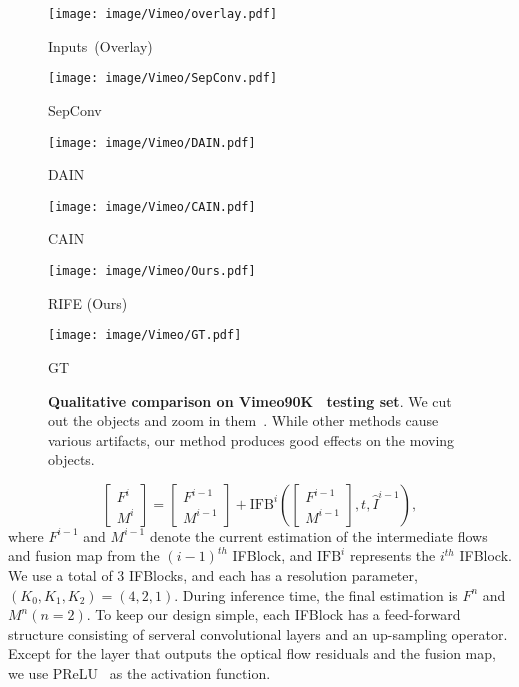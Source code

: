 \documentclass[final]{cvpr}
\begin{document}
\begin{figure*}[htbp]
  \centering
  \begin{minipage}[t]{0.162\linewidth}
  \centering
  \texttt{[image: image/Vimeo/overlay.pdf]}
  \centerline{Inputs~(Overlay)}
  \end{minipage}
  \begin{minipage}[t]{0.162\linewidth}
  \centering
  \texttt{[image: image/Vimeo/SepConv.pdf]}
  \centerline{SepConv~\cite{niklaus2017video}}
  \end{minipage}
\begin{minipage}[t]{0.162\linewidth}
  \centering
  \texttt{[image: image/Vimeo/DAIN.pdf]}
  \centerline{DAIN~\cite{bao2019depth}}
  \end{minipage}
  \begin{minipage}[t]{0.162\linewidth}
  \centering
  \texttt{[image: image/Vimeo/CAIN.pdf]}
  \centerline{CAIN~\cite{choi2020channel}}
  \end{minipage}
  \begin{minipage}[t]{0.163\textwidth}
  \centering
  \texttt{[image: image/Vimeo/Ours.pdf]}
  \centerline{RIFE (Ours)}
  \end{minipage}
  \begin{minipage}[t]{0.1635\textwidth}
  \centering
  \texttt{[image: image/Vimeo/GT.pdf]}
  \centerline{GT}
  \end{minipage}
  \caption{\textbf{Qualitative comparison on Vimeo90K~\cite{xue2019video} testing set}. We cut out the objects and zoom in them~\cite{choi2020channel}. While other methods cause various artifacts, our method produces good effects on the moving objects.}
\label{fig:Vimeo}
\end{figure*} 
\begin{equation}
\left[ \begin{array}{c}F^i \\ M^i \end{array} \right ]= \left[ \begin{array}{c}F^{i-1} \\ M^{i-1} \end{array} \right ]+ \text{IFB}^{i}(\left[ \begin{array}{c}F^{i-1} \\ M^{i-1} \end{array} \right ], t, \widehat{I}^{i-1}),
\end{equation}
where $F^{i-1}$ and $M^{i-1}$ denote the current estimation of the intermediate flows and fusion map from the $(i-1)^{th}$ IFBlock, and $\text{IFB}^{i}$ represents the $i^{th}$ IFBlock. We use a total of 3 IFBlocks, and each has a resolution parameter, $(K_0, K_1, K_2)=(4,2,1)$. During inference time, the final estimation is $F^n$ and $M^n(n=2)$. To keep our design simple, each IFBlock has a feed-forward structure consisting of serveral convolutional layers and an up-sampling operator. Except for the layer that outputs the optical flow residuals and the fusion map, we use PReLU~\cite{he2015delving} as the activation function.
\end{document}

